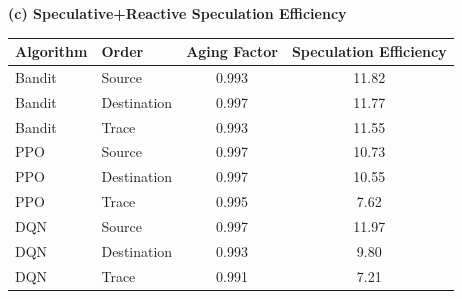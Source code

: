 \begin{table}[t]
\vspace{0.8em}
\textbf{(c) Speculative+Reactive Speculation Efficiency}\\[0.4em]
\begin{tabular}{@{}llcc@{}}
\toprule
Algorithm & Order & Aging Factor & Speculation Efficiency \\
\midrule
Bandit & Source & 0.993 & 11.82 \\
Bandit & Destination & 0.997 & 11.77 \\
Bandit & Trace & 0.993 & 11.55 \\
PPO & Source & 0.997 & 10.73 \\
PPO & Destination & 0.997 & 10.55 \\
PPO & Trace & 0.995 & 7.62 \\
DQN & Source & 0.997 & 11.97 \\
DQN & Destination & 0.993 & 9.80 \\
DQN & Trace & 0.991 & 7.21 \\
\bottomrule
\end{tabular}
\end{table}
